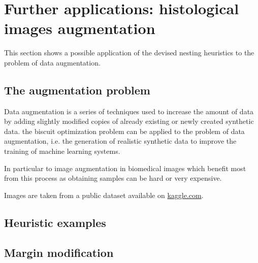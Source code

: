 
\section{Further applications: histological images augmentation}
This section shows a possible application of the devised nesting heuristics to the problem of data augmentation.

\subsection{The augmentation problem}
Data augmentation is a series of techniques used to increase the amount of data by adding slightly modified copies of already existing or newly created synthetic data.
the biscuit optimization problem can be applied to the problem of data augmentation, i.e. the generation of realistic synthetic data to improve the training of machine learning systems.

In particular to image augmentation in biomedical images which benefit most from this process as obtaining samples can be hard or very expensive.

Images are taken from a public dataset available on \href{https://www.kaggle.com/competitions/data-science-bowl-2018/data}{kaggle.com}.

\subsection{Heuristic examples}


\subsection{Margin modification}



